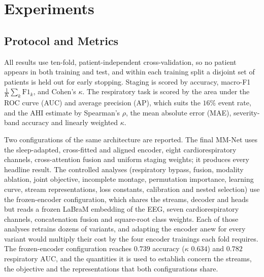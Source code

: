 \documentclass{ieeeaccess}
\newcommand{\fzAcc}{0.739}
\newcommand{\fzK}{0.634}
\newcommand{\fzAuc}{0.782}
\begin{document}
\section{Experiments}
\label{sec:results}
\subsection{Protocol and Metrics}
All results use ten-fold, patient-independent cross-validation, so no patient appears in both
training and test, and within each training split a disjoint set of patients is held out for
early stopping. Staging is scored by accuracy, macro-F1 $\tfrac{1}{K}\sum_k\mathrm{F1}_k$, and
Cohen's $\kappa$. The respiratory task is scored by the area under the ROC curve (AUC) and
average precision (AP), which suits the $16\%$ event rate, and the AHI estimate by Spearman's
$\rho$, the mean absolute error (MAE), severity-band accuracy and linearly weighted $\kappa$.

Two configurations of the same architecture are reported. The final MM-Net uses the
sleep-adapted, cross-fitted and aligned encoder, eight cardiorespiratory channels,
cross-attention fusion and uniform staging weights; it produces every headline result. The
controlled analyses (respiratory bypass, fusion, modality ablation, joint objective, incomplete
montage, permutation importance, learning curve, stream representations, loss constants,
calibration and nested selection) use the frozen-encoder configuration, which shares the
streams, decoder and heads but reads a frozen LaBraM embedding of the EEG, seven
cardiorespiratory channels, concatenation fusion and square-root class weights. Each of those
analyses retrains dozens of variants, and adapting the encoder anew for every variant would
multiply their cost by the four encoder trainings each fold requires. The frozen-encoder
configuration reaches $\fzAcc$ accuracy ($\kappa$ $\fzK$) and $\fzAuc$ respiratory AUC, and the
quantities it is used to establish concern the streams, the objective and the
representations that both configurations share.
\end{document}
